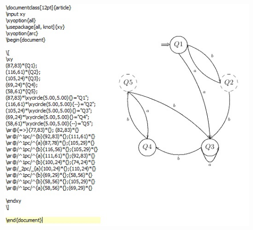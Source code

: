 \documentclass[12pt,a4paper,spanish]{book}
\begin{document}
\begin{itemize}
\begin{enumerate}
\begin{center}
\includegraphics{late1.jpg}
\end{center}


\end{enumerate}
\end{itemize}
\end{document}
